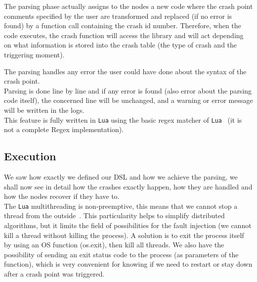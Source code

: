 \documentclass{eplmastersthesis}
\begin{document}
        The parsing phase actually assigns to the nodes a new code where the
        crash point comments specified by the user are transformed and
        replaced (if no error is found) by a function call containing the
        crash id number. Therefore, when the code executes, the crash
        function will access the library and will act depending on what
        information is stored into the crash table (the type of crash and
        the triggering moment).

        The parsing handles any error the user could have done about the
        syntax of the crash point.\\
        Parsing is done line by line and if any error is found (also error
        about the parsing code itself), the concerned line will be unchanged, and
        a warning or error message will be written in the logs.\\
        This feature is fully written in \texttt{Lua} using the basic regex matcher
        of \texttt{Lua}~\cite{RegexLua} (it is not a complete Regex implementation).

      \subsection{Execution}

        We saw how exactly we defined our DSL and how we achieve the parsing,
        we shall now see in detail how the crashes exactly happen, how they
        are handled and how the nodes recover if they have to.\\

        The \texttt{Lua} multithreading is non-preemptive, this means that we cannot stop a thread from the
        outside~\cite{CoroutineLua}. This particularity helps to simplify distributed algorithms,
        but it limits the field of possibilities for the fault injection
        (we cannot kill a thread without killing the process).
        A solution is to exit the process itself by using an OS function (os.exit),
        then kill all threads. We also have the possibility of sending an exit
        status code to the process (as parameters of the function),
        which is very convenient for knowing if we need to restart or stay
        down after a crash point was triggered.\\
\end{document}

